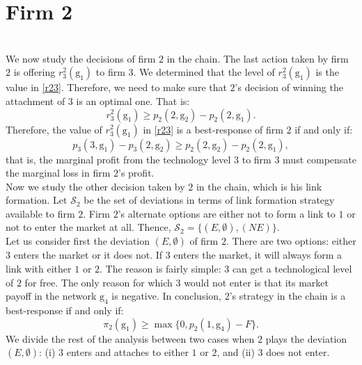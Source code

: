 \documentclass{article}
\begin{document}
\indent \chapter{\textbf{Firm 2}}\\
We now study the decisions of firm $2$ in the chain. The last action taken by firm $2$ is offering $r^2_3(\text{g}_1)$ to firm $3$. We determined that the level of $r^2_3(\text{g}_1)$ is the value in \eqref{r23}. Therefore, we need to make sure that $2$'s decision of winning the attachment of $3$ is an optimal one. That is: 
\begin{equation*}
    r^2_3(\text{g}_1)\geq p_2(2,\text{g}_2)-p_2(2,\text{g}_1).
\end{equation*}
Therefore, the value of $r^2_3(\text{g}_1)$ in \eqref{r23} is a best-response of firm $2$ if and only if: 
\begin{equation}
   p_3(3,\text{g}_1)-p_3(2,\text{g}_2)\geq p_2(2,\text{g}_2)-p_2(2,\text{g}_1),
\end{equation}
that is, the marginal profit from the technology level $3$ to firm $3$ must compensate the marginal loss in firm $2$'s profit.\\

Now we study the other decision taken by $2$ in the chain, which is his link formation. Let $\mathcal{S}_2$ be the set of deviations in terms of link formation strategy available to firm $2$. Firm $2$'s alternate options are either not to form a link to $1$ or not to enter the market at all. Thence, $\mathcal{S}_2=\{(E,\emptyset), (NE)\}$.  \\ 
Let us consider first the deviation $(E,\emptyset)$ of firm $2$. There are two options: either $3$ enters the market or it does not. If $3$ enters the market, it will always form a link with either $1$ or $2$. The reason is fairly simple: $3$ can get a technological level of $2$ for free. The only reason for which $3$ would not enter is that its market payoff in the network $\text{g}_4$ is negative. In conclusion, $2$'s strategy in the chain is a best-response if and only if: 
\begin{equation*}
    \pi_2(\text{g}_1)\geq \max\{0, p_2(1,\text{g}_4)-F\}.
\end{equation*}
We divide the rest of the analysis between two cases when $2$ plays the deviation $(E,\emptyset)$: (i) $3$ enters and attaches to either $1$ or $2$, and (ii) $3$ does not enter. \\
\end{document}
